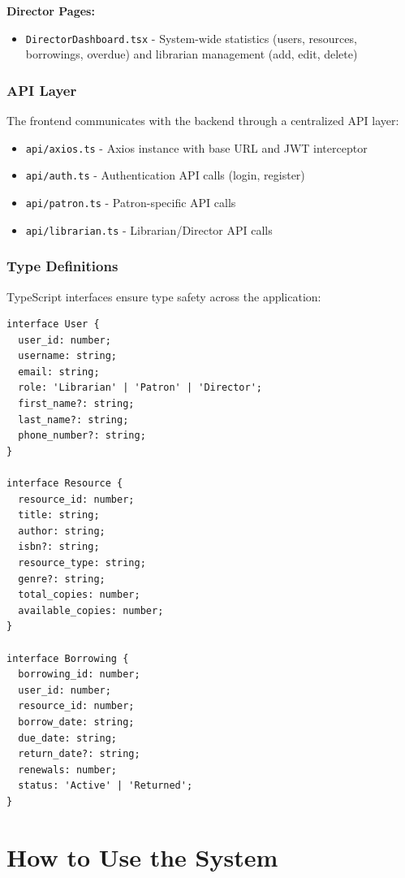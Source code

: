 \documentclass[11pt,a4paper]{article}
\begin{document}
\textbf{Director Pages:}
\begin{itemize}
    \item \texttt{DirectorDashboard.tsx} - System-wide statistics (users, resources, borrowings, overdue) and librarian management (add, edit, delete)
\end{itemize}

\subsubsection{API Layer}

The frontend communicates with the backend through a centralized API layer:

\begin{itemize}
    \item \texttt{api/axios.ts} - Axios instance with base URL and JWT interceptor
    \item \texttt{api/auth.ts} - Authentication API calls (login, register)
    \item \texttt{api/patron.ts} - Patron-specific API calls
    \item \texttt{api/librarian.ts} - Librarian/Director API calls
\end{itemize}

\subsubsection{Type Definitions}

TypeScript interfaces ensure type safety across the application:

\begin{verbatim}
interface User {
  user_id: number;
  username: string;
  email: string;
  role: 'Librarian' | 'Patron' | 'Director';
  first_name?: string;
  last_name?: string;
  phone_number?: string;
}

interface Resource {
  resource_id: number;
  title: string;
  author: string;
  isbn?: string;
  resource_type: string;
  genre?: string;
  total_copies: number;
  available_copies: number;
}

interface Borrowing {
  borrowing_id: number;
  user_id: number;
  resource_id: number;
  borrow_date: string;
  due_date: string;
  return_date?: string;
  renewals: number;
  status: 'Active' | 'Returned';
}
\end{verbatim}

\section{How to Use the System}
\end{document}
